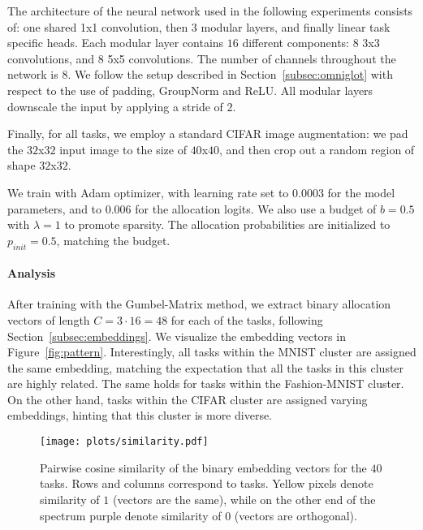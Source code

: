 \documentclass[conference]{IEEEtran}
\begin{document}
The architecture of the neural network used in the following experiments consists of: one shared 1x1 convolution, then $3$ modular layers, and finally linear task specific heads. Each modular layer contains $16$ different components: $8$ 3x3 convolutions, and $8$ 5x5 convolutions. The number of channels throughout the network is $8$. We follow the setup described in Section~\ref{subsec:omniglot} with respect to the use of padding, GroupNorm and ReLU. All modular layers downscale the input by applying a stride of $2$.

Finally, for all tasks, we employ a standard CIFAR image augmentation: we pad the $32$x$32$ input image to the size of $40$x$40$, and then crop out a random region of shape $32$x$32$.

We train with Adam optimizer, with learning rate set to $0.0003$ for the model parameters, and to $0.006$ for the allocation logits. We also use a budget of $b = 0.5$ with $\lambda = 1$ to promote sparsity. The allocation probabilities are initialized to $p_{init} = 0.5$, matching the budget.

\paragraph{Analysis}

After training with the Gumbel-Matrix method, we extract binary allocation vectors of length $C = 3 \cdot 16 = 48$ for each of the tasks, following Section~\ref{subsec:embeddings}.
We visualize the embedding vectors in Figure~\ref{fig:pattern}. Interestingly, all tasks within the MNIST cluster are assigned the same embedding, matching the expectation that all the tasks in this cluster are highly related. The same holds for tasks within the Fashion-MNIST cluster. On the other hand, tasks within the CIFAR cluster are assigned varying embeddings, hinting that this cluster is more diverse.

\begin{figure}[t]
\begin{center}
\texttt{[image: plots/similarity.pdf]}
\end{center}
\caption{Pairwise cosine similarity of the binary embedding vectors for the $40$ tasks. Rows and columns correspond to tasks. Yellow pixels denote similarity of $1$ (vectors are the same), while on the other end of the spectrum purple denote similarity of $0$ (vectors are orthogonal).}\label{fig:similarity}
\end{figure}
\end{document}
